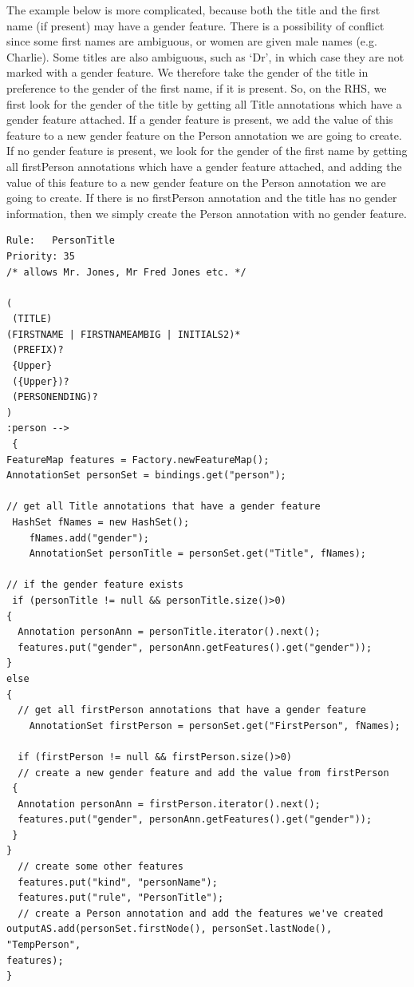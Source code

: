 The example below is more complicated, because both the title and the
first name (if present) may have a gender feature. There is a
possibility of conflict since some first names are ambiguous, or women
are given male names (e.g. Charlie). Some titles are also ambiguous,
such as `Dr', in which case they are not marked with a gender
feature. We therefore take the gender of the title in preference to
the gender of the first name, if it is present. So, on the RHS, we
first look for the gender of the title by getting all Title
annotations which have a gender feature attached. If a gender feature
is present, we add the value of this feature to a new gender feature
on the Person annotation we are going to create. If no gender feature
is present, we look for the gender of the first name by getting all
firstPerson annotations which have a gender feature attached, and adding
the value of this feature to a new gender feature on the Person
annotation we are going to create. If there is no firstPerson
annotation and the title has no gender information, then we simply
create the Person annotation with no gender feature.

\begin{small}
\begin{verbatim}
Rule:	PersonTitle
Priority: 35
/* allows Mr. Jones, Mr Fred Jones etc. */
 
(
 (TITLE)
(FIRSTNAME | FIRSTNAMEAMBIG | INITIALS2)*
 (PREFIX)?
 {Upper}
 ({Upper})?
 (PERSONENDING)?
)
:person -->
 {
FeatureMap features = Factory.newFeatureMap();
AnnotationSet personSet = bindings.get("person");
  
// get all Title annotations that have a gender feature 
 HashSet fNames = new HashSet();
    fNames.add("gender");
    AnnotationSet personTitle = personSet.get("Title", fNames);

// if the gender feature exists
 if (personTitle != null && personTitle.size()>0)
{
  Annotation personAnn = personTitle.iterator().next();
  features.put("gender", personAnn.getFeatures().get("gender"));
}
else
{
  // get all firstPerson annotations that have a gender feature
    AnnotationSet firstPerson = personSet.get("FirstPerson", fNames);

  if (firstPerson != null && firstPerson.size()>0)
  // create a new gender feature and add the value from firstPerson
 {
  Annotation personAnn = firstPerson.iterator().next();
  features.put("gender", personAnn.getFeatures().get("gender"));
 }
}
  // create some other features
  features.put("kind", "personName");
  features.put("rule", "PersonTitle");
  // create a Person annotation and add the features we've created
outputAS.add(personSet.firstNode(), personSet.lastNode(), "TempPerson",
features);
}
\end{verbatim}
\end{small}


